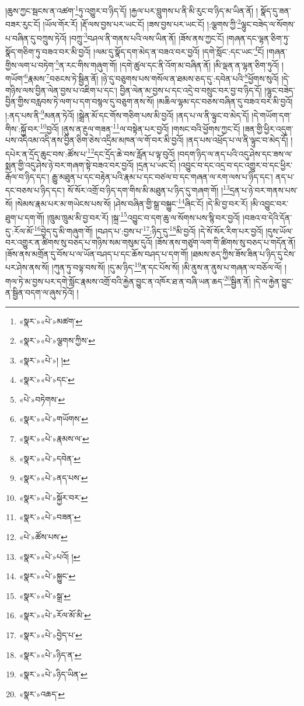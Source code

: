 །ཆུས་ཀྱང་སྦངས་ན་འཚག་\footnote{«སྣར་»«པེ་»མཚག་}ཏུ་འགྱུར་བ་ཉིད་དོ། །རྐྱལ་པར་བླུགས་པ་ནི་མི་རུང་བ་ཉིད་མ་ཡིན་ནོ། །
སྣོད་དུ་ཟན་བཟར་རུང་ངོ། །ཡོལ་གོར་རོ། །རྡོ་ལས་བྱས་པར་ཡང་ངོ། །ཟས་བྱས་པར་ཡང་ངོ། །:ལྕགས་ཀྱི་\footnote{«སྣར་»«པེ་»ལྕགས་ཀྱིས་}ལྷུང་བཟེད་ལ་སོགས་པ་བཞིན་དུ་བཀྲུས་ཏེའོ། །བཀྲུ་\footnote{«སྣར་»«པེ་»། །}བཤལ་ནི་གནས་པའི་ལས་ཡིན་ནོ། །ཟོས་ནས་ཀྱང་ངོ། །གཞན་དང་ལྷན་ཅིག་ཏུ་སྣོད་གཅིག་ཏུ་བཟའ་བར་མི་བྱའོ། །ལམ་དུ་སྣོད་དག་མེད་ན་བཟའ་བར་བྱའོ། །དགེ་སློང་:དང་ཡང་\footnote{«སྣར་»«པེ་»དང་}ངོ། །གཞན་གྱིས་ལག་པ་བཏེག་\footnote{«པེ་»བཏེགས་}ན་རང་གིས་གཞུག་གོ། །དགེ་ཚུལ་དང་ནི་འོག་མ་བཞིན་ནོ། །མི་ལྡན་ན་ལྷན་ཅིག་ཏུའོ། །གཡོག་\footnote{«སྣར་»«པེ་»གཡོགས་}རྣམས་\footnote{«སྣར་»«པེ་»རྣམས་ལ་}བཅངས་ཏེ་སྦྱིན་ནོ། །ཉེ་དུ་བཅུགས་པས་གསོལ་ན་ཐམས་ཅད་དུ་:དབེན་པའི་\footnote{«སྣར་»«པེ་»དབེན་}ཕྱོགས་སུའོ། །དེ་གཉིས་ལས་བྱིན་ལེན་བྱས་པ་འཇིག་པ་དང་། བྱིན་ལེན་མ་བྱས་པ་དང་འདྲེ་བ་བསྲུང་བར་བྱ་བ་ཉིད་དོ། །ལྷུང་བཟེད་བྱིན་གྱིས་བརླབས་ཏེ་ལག་པ་དག་བསྙལ་དུ་བཅུག་ནས་སོ། །མཆིལ་ལྷམ་དང་བཅས་བཞིན་དུ་བཟའ་བར་མི་བྱའོ། །:ནད་པས་ནི་\footnote{«སྣར་»«པེ་»ནད་པས་}མནན་ཏེའོ། །སྒྲེན་མོ་དང་གོས་གཅིག་པས་མི་བྱའོ། །ནད་པ་ལ་ནི་ལྟུང་བ་མེད་དོ། །དེ་གཡོག་དག་གིས་:སྐྱོ་བར་\footnote{«སྣར་»«པེ་»སྐྱོར་བར་}བྱའོ། །ནུས་ན་རྔུལ་གཟན་\footnote{«སྣར་»«པེ་»བཟན་}ལ་བསྟེན་པར་བྱའོ། །གསང་བའི་ཕྱོགས་ཀྱང་ངོ། །ཟན་གྱི་ཕྱིར་འདུག་པས་འདིའམ་འདི་ནས་བྱིན་ཅིག་ཅེས་འདྲིམ་མཁན་ལ་གོ་བར་མི་བྱའོ། །ནད་པས་འཕྲོད་པ་ལ་ནི་ལྟུང་བ་མེད་དོ། །དཔེར་ན་དྲོད་ཆུང་བས་:ཚོས་པ་\footnote{«པེ་»ཚོས་པས་}དང་དྲོད་ཆེ་བས་རློན་པ་ལྟ་བུའོ། །བདག་ཉིད་ལ་ནད་པའི་འདུ་ཤེས་དང་ཟས་ལ་སྨན་གྱི་འདུ་ཤེས་ཉེ་བར་གཞག་སྟེ་བཟའ་བར་བྱའོ། །དྲན་པ་ཡང་ངོ། །འབྱུང་བ་དང་འདྲ་བ་དང་འགྱུར་བ་དང་ཕྱིར་རྒོལ་བ་ཉིད་དང་། རྒྱུ་མཐུན་པ་དང་བརྟེན་པའི་རྣམ་པ་དང་བཙལ་བ་དང་གཞན་ལ་རག་ལས་པ་ཉིད་དང་། ནད་པ་དང་བཅས་པ་ཉིད་དང་། སོ་སོར་འགྲོ་བ་ཉིད་དག་གིས་མི་མཐུན་པ་ཉིད་དུ་གཞག་གོ། །\footnote{«སྣར་»«པེ་»པའོ། །}དྲན་པ་ཉེ་བར་གནས་པས་སོ། །སེམས་རྣམ་པར་མ་གཡེངས་པས་སོ། །ཤེས་བཞིན་གྱི་སྒྲ་བསྐྱུང་\footnote{«སྣར་»«པེ་»སྐྱུང་}ཞིང་ངོ། །དེ་མི་བྱ་བར་རོ། །མི་འབྱུང་བར་ཐུག་པ་དག་གོ། །ཁྲུམ་ཁྲུམ་མི་བྱ་བར་རོ། །སྐྲ་\footnote{«སྣར་»«པེ་»སྒྲ་}འབྱུང་བ་དག་ཆུ་ལ་སོགས་པས་སྙི་བར་བྱའོ། །བཟའ་བ་དེའི་དོན་དུ་:རོལ་མོ་\footnote{«སྣར་»«པེ་»རོལ་མོ་མི་}བྱེད་དུ་མི་གཞུག་གོ། །བཤད་པ་:བྱས་པ་\footnote{«སྣར་»«པེ་»བྱེད་པ་}:ཉིད་དུ་\footnote{«སྣར་»«པེ་»ཉིད་ན་}མི་བྱའོ། །དེ་སོ་སོར་རིག་པར་བྱའོ། །དུས་ཡོལ་བར་འགྱུར་ན་ཚིགས་སུ་བཅད་པ་གཉིས་སམ་གསུམ་དུའོ། །ཟོས་ནས་གཙུག་ལག་གི་ཚིགས་སུ་བཅད་པ་གདོན་ནོ། །ཟོས་ནས་མགྲོན་དུ་བོས་པ་ལ་ཡོན་བཤད་པ་དང་ཆོས་བཤད་པ་དག་གོ། །ཐམས་ཅད་ཀྱིས་ཟོས་ཟིན་པ་ཉིད་དུ་ངེས་པར་ཤེས་ནས་སོ། །ཀུན་ཏུ་བལྟ་བས་སོ། །དུ་མ་ཉིད་\footnote{«སྣར་»«པེ་»ཉིད་ཡིན་}ན་དང་པོས་སོ། །མི་ནུས་ན་ནུས་པ་གཞན་ལ་བཅོལ་ལོ། །གལ་ཏེ་མ་བྱས་པར་དགེ་སློང་རྣམས་འགྲོ་བའི་རྐྱེན་བྱུང་ན་འཁོར་ཐ་ན་བཞི་ཡན་ཆད་\footnote{«སྣར་»འཆད་}སྦྱིན་ནོ། །དེ་ལ་རྐྱེན་བྱུང་ན་སྦྱིན་བདག་ལ་ཞུས་ཏེའོ། །
